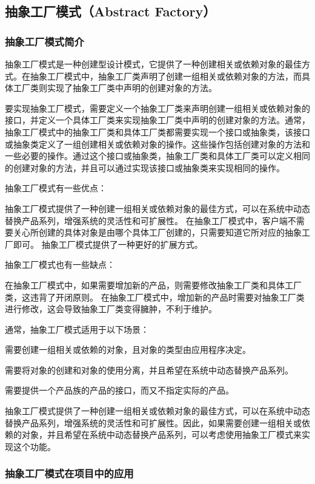 \subsection{抽象工厂模式（Abstract Factory）}

\subsubsection{抽象工厂模式简介}

抽象工厂模式是一种创建型设计模式，它提供了一种创建相关或依赖对象的最佳方式。在抽象工厂模式中，抽象工厂类声明了创建一组相关或依赖对象的方法，而具体工厂类则实现了抽象工厂类中声明的创建对象的方法。

要实现抽象工厂模式，需要定义一个抽象工厂类来声明创建一组相关或依赖对象的接口，并定义一个具体工厂类来实现抽象工厂类中声明的创建对象的方法。通常，抽象工厂模式中的抽象工厂类和具体工厂类都需要实现一个接口或抽象类，该接口或抽象类定义了一组创建相关或依赖对象的操作。这些操作包括创建对象的方法和一些必要的操作。通过这个接口或抽象类，抽象工厂类和具体工厂类可以定义相同的创建对象的方法，并且可以通过实现该接口或抽象类来实现相同的操作。

抽象工厂模式有一些优点：

抽象工厂模式提供了一种创建一组相关或依赖对象的最佳方式，可以在系统中动态替换产品系列，增强系统的灵活性和可扩展性。
在抽象工厂模式中，客户端不需要关心所创建的具体对象是由哪个具体工厂创建的，只需要知道它所对应的抽象工厂即可。
抽象工厂模式提供了一种更好的扩展方式。

抽象工厂模式也有一些缺点：

在抽象工厂模式中，如果需要增加新的产品，则需要修改抽象工厂类和具体工厂类，这违背了开闭原则。
在抽象工厂模式中，增加新的产品时需要对抽象工厂类进行修改，这会导致抽象工厂类变得臃肿，不利于维护。

通常，抽象工厂模式适用于以下场景：

需要创建一组相关或依赖的对象，且对象的类型由应用程序决定。

需要将对象的创建和对象的使用分离，并且希望在系统中动态替换产品系列。

需要提供一个产品族的产品的接口，而又不指定实际的产品。

抽象工厂模式提供了一种创建一组相关或依赖对象的最佳方式，可以在系统中动态替换产品系列，增强系统的灵活性和可扩展性。因此，如果需要创建一组相关或依赖的对象，并且希望在系统中动态替换产品系列，可以考虑使用抽象工厂模式来实现这个功能。

\subsubsection{抽象工厂模式在项目中的应用}

